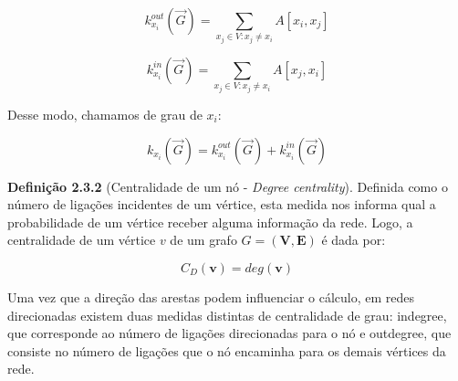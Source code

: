 \documentclass[12pt]{article}
\begin{document}
\begin{equation}
k^{out}_{x_{i}}(\Vec{G}) = \sum_{x_j \in V : x_j \neq x_i}^{} A[x_i,x_j]
\label{eq:grauOutput}
\end{equation}

\begin{equation}
k^{in}_{x_{i}}(\Vec{G}) = \sum_{x_j \in V : x_j \neq x_i}^{} A[x_j,x_i]
\label{eq:grauInput}
\end{equation}

Desse modo, chamamos de grau de $x_i$: 

\begin{equation}
k_{x_i}(\Vec{G}) = k^{out}_{x_{i}}(\Vec{G}) + k^{in}_{x_{i}}(\Vec{G})
\label{eq:grau}
\end{equation}






\noindent \textbf{Definição 2.3.2} (Centralidade de um nó - \textit{Degree centrality}). Definida como o número de ligações incidentes de um vértice, esta medida nos informa qual a probabilidade de um vértice receber alguma informação da rede. Logo, a centralidade de um vértice $v$ de um grafo $G = (\bm V,\bm E)$ é dada por:

\begin{equation}
    C_D(\bm v) = deg(\bm v)
\end{equation}

Uma vez que a direção das arestas podem influenciar o cálculo, em redes direcionadas existem duas medidas distintas de centralidade de grau: indegree, que corresponde ao número de ligações direcionadas para o nó e outdegree, que consiste no número de ligações que o nó encaminha para os demais vértices da rede. 
\end{document}

